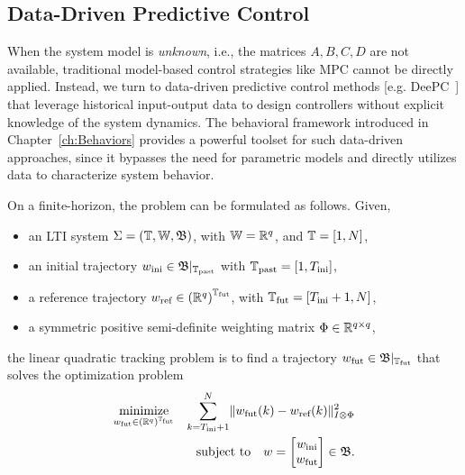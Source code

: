 \newpage
\subsection{Data-Driven Predictive Control}

When the system model is \emph{unknown}, i.e., the matrices $A, B, C, D$ are not available, traditional model-based control strategies like MPC cannot be directly applied. Instead, we turn to data-driven predictive control methods [e.g. DeePC~\cite{jeremy2019}] that leverage historical input-output data to design controllers without explicit knowledge of the system dynamics. The behavioral framework introduced in Chapter~\ref{ch:Behaviors} provides a powerful toolset for such data-driven approaches, since it bypasses the need for parametric models and directly utilizes data to characterize system behavior.

On a finite-horizon, the problem can be formulated as follows. Given,
\begin{itemize}
    \item an LTI system $\Sigma = (\mathbb{T}, \mathbb{W}, \mathfrak{B})$, with $\mathbb{W} = \mathbb{R}^q$, and $\mathbb{T} = [1,N]$,
    \item an initial trajectory $w_{\textrm{ini}} \in \mathfrak{B} |_{\mathbb{T}_{\textrm{past}}}$ with $\mathbb{T}_{\textrm{past}} = [1, T_{\textrm{ini}}]$,
    \item a reference trajectory $w_{\textrm{ref}} \in {(\mathbb{R}^q)}^{\mathbb{T}_{\textrm{fut}}}$, with $\mathbb{T}_{\textrm{fut}} = [T_{\textrm{ini}}+1, N]$,
    \item a symmetric positive semi-definite weighting matrix $\Phi \in \mathbb{R}^{q \times q}$,
\end{itemize}
the linear quadratic tracking problem is to find a trajectory $w_{\textrm{fut}} \in \mathfrak{B} |_{\mathbb{T}_{\textrm{fut}}}$ that solves the optimization problem
\begin{equation}\label{eq:lqt_behavioral}
    \begin{aligned}
        \underset{w_{\textrm{fut}} \in {(\mathbb{R}^q)}^{\mathbb{T}_{\textrm{fut}}}}{\text{minimize}} && \sum_{k=T_{\textrm{ini}}+1}^{N} \lVert w_{\textrm{fut}}(k) - w_{\textrm{ref}}(k) \rVert_{I \otimes \Phi}^2 \\
       && \text{subject to} \quad w = \begin{bmatrix} w_{\textrm{ini}} \\ w_{\textrm{fut}} \end{bmatrix} \in \mathfrak{B}.
    \end{aligned}
\end{equation}


